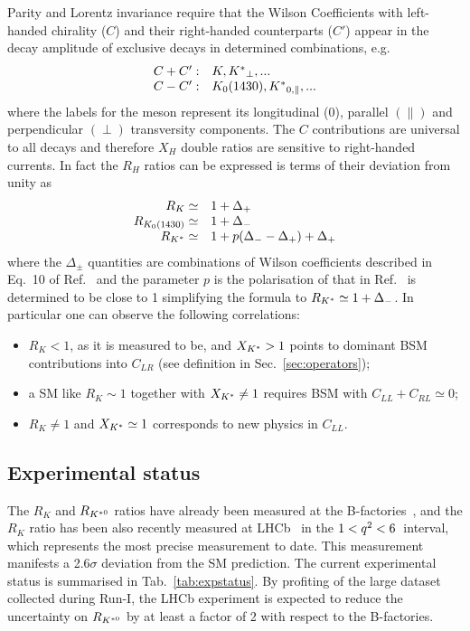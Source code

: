 Parity and Lorentz invariance require that the Wilson Coefficients with left-handed chirality ($C$)
and their right-handed counterparts ($C'$) appear in the decay amplitude of exclusive decays in
determined combinations, e.g.
\begin{equation}
\begin{array}{ll}
C+C': & K, {{K}^*}_{\perp}, ...  \\
C-C': & K_0(1430), {{K}^*}_{0,\parallel}, ...
\end{array}
\end{equation}
where the labels for the \Kstar meson represent its longitudinal (0), parallel $(\parallel)$ and
perpendicular $(\perp)$ transversity components. The $C$ contributions are universal to
all decays and therefore $X_H$ double ratios are sensitive to right-handed currents.
In fact the $R_H$ ratios can be expressed is terms of their deviation from unity as
\begin{equation}
\begin{array}{rl}
R_K \simeq 			& 1+ \Delta_+ 		\\
R_{K_0(1430)} \simeq 	& 1+ \Delta_-		\\
R_{{K}^*} \simeq 		& 1+ p(\Delta_- - \Delta_+) + \Delta_+
\end{array}
\end{equation}
where the $\Delta_\pm$ quantities are combinations of Wilson coefficients
described in Eq.~10 of Ref.~\cite{Hiller:2014ula} and the parameter $p$ is the polarisation of \Kstar
that in Ref.~\cite{Hiller:2014ula} is determined to be close to 1 simplifying the formula to $R_{{{K}^*}} \simeq 1+ \Delta_-$.
In particular one can observe the following correlations: 
\begin{itemize}
\item $R_K < 1$, as it is measured to be, and $X_{{{K}^*}} > 1$ points to dominant BSM contributions into $C_{LR}$ (see definition in Sec.~\ref{sec:operators});
\item a SM like $R_K \sim 1$ together with $X_{{{K}^*}} \neq 1$ requires BSM with $C_{LL} + C_{RL} \simeq 0$;
\item $R_K \neq 1$ and $X_{{{K}^*}} \simeq 1$ corresponds to new physics in $C_{LL}$.
\end{itemize}

\subsection{Experimental status}

The $R_K$ and $R_{{{K}^{*0}}}$ ratios have already been measured at the B-factories~\cite{Lees:2012tva,Wei:2009zv},
and the $R_K$ ratio has been also recently measured at LHCb~\cite{LHCb-PAPER-2014-024} in the $1 < {q^2} < 6$~\gevgevcccc \qsq interval, which represents the most precise measurement to date. This measurement manifests a 2.6$\sigma$
deviation from the SM prediction. 
The current experimental status is summarised in Tab.~\ref{tab:expstatus}. By profiting of the large dataset collected during Run-I, the LHCb experiment is expected
to reduce the uncertainty on $R_{{{K}^{*0}}}$ by at least a factor of 2 with respect to the B-factories.

